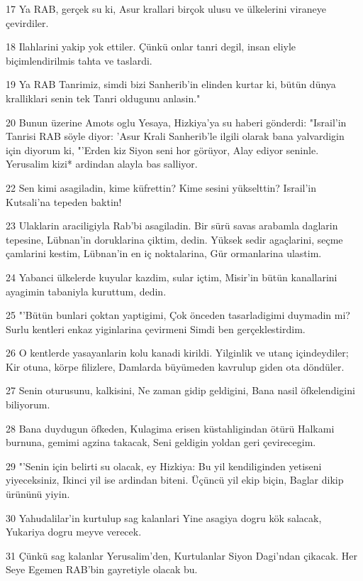 \par 17 Ya RAB, gerçek su ki, Asur krallari birçok ulusu ve ülkelerini viraneye çevirdiler.
\par 18 Ilahlarini yakip yok ettiler. Çünkü onlar tanri degil, insan eliyle biçimlendirilmis tahta ve taslardi.
\par 19 Ya RAB Tanrimiz, simdi bizi Sanherib'in elinden kurtar ki, bütün dünya kralliklari senin tek Tanri oldugunu anlasin."
\par 20 Bunun üzerine Amots oglu Yesaya, Hizkiya'ya su haberi gönderdi: "Israil'in Tanrisi RAB söyle diyor: 'Asur Krali Sanherib'le ilgili olarak bana yalvardigin için diyorum ki, "'Erden kiz Siyon seni hor görüyor, Alay ediyor seninle. Yerusalim kizi* ardindan alayla bas salliyor.
\par 22 Sen kimi asagiladin, kime küfrettin? Kime sesini yükselttin? Israil'in Kutsali'na tepeden baktin!
\par 23 Ulaklarin araciligiyla Rab'bi asagiladin. Bir sürü savas arabamla daglarin tepesine, Lübnan'in doruklarina çiktim, dedin. Yüksek sedir agaçlarini, seçme çamlarini kestim, Lübnan'in en iç noktalarina, Gür ormanlarina ulastim.
\par 24 Yabanci ülkelerde kuyular kazdim, sular içtim, Misir'in bütün kanallarini ayagimin tabaniyla kuruttum, dedin.
\par 25 "'Bütün bunlari çoktan yaptigimi, Çok önceden tasarladigimi duymadin mi? Surlu kentleri enkaz yiginlarina çevirmeni Simdi ben gerçeklestirdim.
\par 26 O kentlerde yasayanlarin kolu kanadi kirildi. Yilginlik ve utanç içindeydiler; Kir otuna, körpe filizlere, Damlarda büyümeden kavrulup giden ota döndüler.
\par 27 Senin oturusunu, kalkisini, Ne zaman gidip geldigini, Bana nasil öfkelendigini biliyorum.
\par 28 Bana duydugun öfkeden, Kulagima erisen küstahligindan ötürü Halkami burnuna, gemimi agzina takacak, Seni geldigin yoldan geri çevirecegim.
\par 29 "'Senin için belirti su olacak, ey Hizkiya: Bu yil kendiliginden yetiseni yiyeceksiniz, Ikinci yil ise ardindan biteni. Üçüncü yil ekip biçin, Baglar dikip ürününü yiyin.
\par 30 Yahudalilar'in kurtulup sag kalanlari Yine asagiya dogru kök salacak, Yukariya dogru meyve verecek.
\par 31 Çünkü sag kalanlar Yerusalim'den, Kurtulanlar Siyon Dagi'ndan çikacak. Her Seye Egemen RAB'bin gayretiyle olacak bu.
